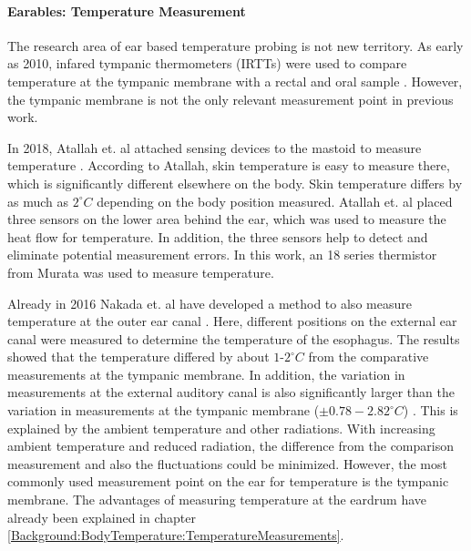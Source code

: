 \paragraph{Earables: Temperature Measurement}
The research area of ear based temperature probing is not new territory.
As early as 2010, infared tympanic thermometers (IRTTs) were used to compare temperature at the tympanic membrane with a rectal and oral sample \cite{bagleyValidityFieldExpedient2011, basakComparisonThreeDifferent2013, bhanguDetectionManagementHypothermia2010, fogtNoninvasiveMeasuresCore2017, ComparisonTwoMethods, kallmunzerLocalHeadNeck2011, muthInfraredEarThermometry2010, moran-navarroValiditySkinOral2019, leeValidityInfraredTympanic2011, keeneAccuracyTympanicTemperature2015}.
However, the tympanic membrane is not the only relevant measurement point in previous work. 

In 2018, Atallah et. al attached sensing devices to the mastoid to measure temperature \cite{atallahErgonomicWearableCore2018}. 
According to Atallah, skin temperature is easy to measure there, which is significantly different elsewhere on the body. 
Skin temperature differs by as much as $2 ^\circ C$ depending on the body position measured.
Atallah et. al placed three sensors on the lower area behind the ear, which was used to measure the heat flow for temperature.
In addition, the three sensors help to detect and eliminate potential measurement errors.
In this work, an 18 series thermistor from Murata was used to measure temperature.

Already in 2016 Nakada et. al have developed a method to also measure temperature at the outer ear canal \cite{nakadaDevelopmentMethodEstimating2017a}.
Here, different positions on the external ear canal were measured to determine the temperature of the esophagus. 
The results showed that the temperature differed by about $1\text{-}2 ^\circ C$ from the comparative measurements at the tympanic membrane.
In addition, the variation in measurements at the external auditory canal is also significantly larger than the variation in measurements at the tympanic membrane ($\pm 0.78-2.82 ^\circ C$) \cite{nakadaDevelopmentMethodEstimating2017a}.
This is explained by the ambient temperature and other radiations.
With increasing ambient temperature and reduced radiation, the difference from the comparison measurement and also the fluctuations could be minimized.
However, the most commonly used measurement point on the ear for temperature is the tympanic membrane. 
The advantages of measuring temperature at the eardrum have already been explained in chapter \ref{Background:BodyTemperature:TemperatureMeasurements}.

